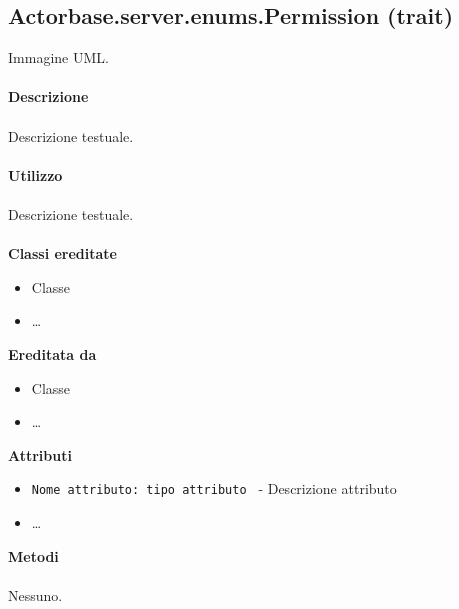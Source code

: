 \documentclass[a4paper]{article}
\begin{document}
	\subsection{Actorbase.server.enums.Permission (trait)}
		Immagine UML.
		\\ \\
		\textbf{Descrizione}
			\\ \\
			Descrizione testuale.
			\\ \\
		\textbf{Utilizzo}
			\\ \\
			Descrizione testuale.
			\\ \\
		\textbf{Classi ereditate}
			\begin{itemize}
				\item Classe
				\item \dots
			\end{itemize}
		\textbf{Ereditata da}
			\begin{itemize}
				\item Classe
				\item \dots
			\end{itemize}
		\textbf{Attributi}
			\begin{itemize}
				\item \texttt{Nome attributo: tipo attributo } - Descrizione attributo
				\item \dots
			\end{itemize}
		\textbf{Metodi}
			\\ \\
			Nessuno.
		
\end{document}
